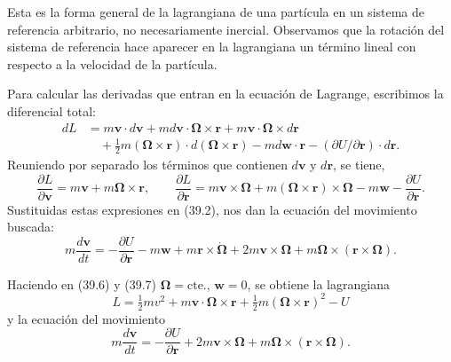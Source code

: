 \documentclass[12pt]{article}
\begin{document}
Esta es la forma general de la lagrangiana de una partícula en un sistema de referencia arbitrario, no necesariamente inercial. Observamos que la rotación del sistema de referencia hace aparecer en la lagrangiana un término lineal con respecto a la velocidad de la partícula.

Para calcular las derivadas que entran en la ecuación de Lagrange, escribimos la diferencial total:
\begin{align*}
dL &= m \mathbf{v} \cdot d\mathbf{v} + m d\mathbf{v} \cdot \mathbf{\Omega} \times \mathbf{r} + m \mathbf{v} \cdot \mathbf{\Omega} \times d\mathbf{r} \\
&\quad + \tfrac{1}{2} m (\mathbf{\Omega} \times \mathbf{r}) \cdot d(\mathbf{\Omega} \times \mathbf{r}) - m d\mathbf{w} \cdot \mathbf{r} - (\partial U/\partial \mathbf{r}) \cdot d\mathbf{r}.
\end{align*}
Reuniendo por separado los términos que contienen $d\mathbf{v}$ y $d\mathbf{r}$, se tiene,
\[
\frac{\partial L}{\partial \mathbf{v}} = m \mathbf{v} + m \mathbf{\Omega} \times \mathbf{r}, \qquad
\frac{\partial L}{\partial \mathbf{r}} = m \mathbf{v} \times \mathbf{\Omega} + m (\mathbf{\Omega} \times \mathbf{r}) \times \mathbf{\Omega} - m \mathbf{w} - \frac{\partial U}{\partial \mathbf{r}}.
\]
Sustituidas estas expresiones en (39.2), nos dan la ecuación del movimiento buscada:
\begin{equation}
m \frac{d\mathbf{v}}{dt} = -\frac{\partial U}{\partial \mathbf{r}} - m \mathbf{w} + m \mathbf{r} \times \mathbf{\dot{\Omega}} + 2m \mathbf{v} \times \mathbf{\Omega} + m \mathbf{\Omega} \times (\mathbf{r} \times \mathbf{\Omega}).
\tag{39.7}
\end{equation}

\vspace{1em}

Haciendo en (39.6) y (39.7) $\mathbf{\Omega} = \text{cte.}$, $\mathbf{w} = 0$, se obtiene la lagrangiana
\begin{equation}
L = \tfrac{1}{2} m v^2 + m \mathbf{v} \cdot \mathbf{\Omega} \times \mathbf{r} + \tfrac{1}{2} m (\mathbf{\Omega} \times \mathbf{r})^2 - U
\tag{39.8}
\end{equation}
y la ecuación del movimiento
\begin{equation}
m \frac{d\mathbf{v}}{dt} = -\frac{\partial U}{\partial \mathbf{r}} + 2m \mathbf{v} \times \mathbf{\Omega} + m \mathbf{\Omega} \times (\mathbf{r} \times \mathbf{\Omega}).
\tag{39.9}
\end{equation}
\end{document}
